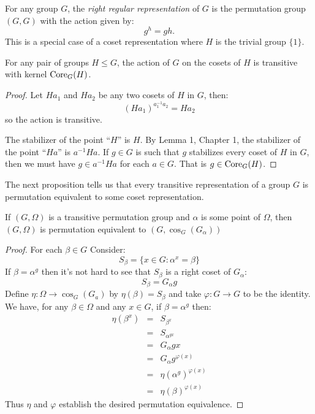\begin{example}
For any group $G$, the \emph{right regular representation}
of $G$ is the permutation group $(G,G)$ with the action given by:
$$ g^{h} = gh. $$
This is a special case of a coset representation 
where $H$ is the trivial group $\{ 1 \}$.
\end{example}


\begin{proposition}
For any pair of groups $H \leq G$, the action of $G$
on the cosets of $H$ is transitive with kernel $\operatorname{Core}_G(H)$.
\begin{proof}
Let $Ha_1$ and $Ha_2$ be any two cosets of $H$ in $G$,
then:
$$(Ha_1)^{a_1^{-1}a_2} = Ha_2$$ 
so the action is transitive.

The stabilizer of the point ``$H$'' is $H$.
By Lemma 1, Chapter 1, 
the stabilizer of the point ``$Ha$'' is $a^{-1}Ha$.
If $g \in G$ is such that $g$ stabilizes every coset of $H$ in $G$,
then we must have $g \in a^{-1}Ha$ for each $a \in G$.
That is $g \in \operatorname{Core}_G(H)$.

\end{proof}
\end{proposition}


The next proposition tells us that every transitive representation
of a group $G$ is permutation equivalent to some coset representation.


\begin{proposition}
If $(G,\Omega)$ is a transitive permutation group
and $\alpha$ is some point of $\Omega$, then
$(G, \Omega)$ is permutation equivalent to $(G, \cos_G(G_\alpha))$

\begin{proof}
For each $\beta \in G$ Consider:
$$ S_\beta = \{ x \in G : \alpha^x = \beta  \} $$
If $\beta = \alpha^g$ then it's not hard to see
that $S_{\beta}$ is a right coset of $G_{\alpha}$:
$$ S_{\beta} = G_{\alpha} g $$
Define $\eta : \Omega \to \cos_G(G_a)$ by $\eta(\beta) = S_\beta$
and take $\varphi : G \to G$ to be the identity.
We have, for any $\beta \in \Omega$ and any $x \in G$,
if $\beta = \alpha^g$ then:
\begin{eqnarray*}
\eta(\beta^x) & = & S_{\beta^x} \\
              & = & S_{\alpha^{gx}} \\
	      & = & G_\alpha gx \\
	      & = & G_\alpha g^{\varphi(x)} \\
	      & = & \eta(\alpha^g)^{\varphi(x)} \\
	      & = & \eta(\beta)^{\varphi(x)}
\end{eqnarray*}
Thus $\eta$ and $\varphi$ establish the desired permutation equivalence.
\end{proof}
\end{proposition}
	
